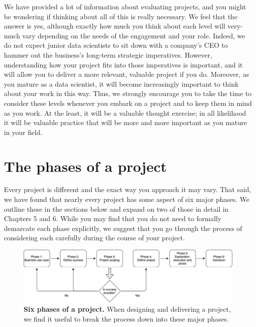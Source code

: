 \documentclass[
]{book}
\begin{document}
We have provided a lot of information about evaluating projects, and you might be wondering if thinking about all of this is really necessary. We feel that the answer is yes, although exactly how much you think about each level will very-much vary depending on the needs of the engagement and your role. Indeed, we do not expect junior data scientists to sit down with a company's CEO to hammer out the business's long-term strategic imperatives. However, understanding how your project fits into those imperatives is important, and it will allow you to deliver a more relevant, valuable project if you do. Moreover, as you mature as a data scientist, it will become increasingly important to think about your work in this way. Thus, we strongly encourage you to take the time to consider these levels whenever you embark on a project and to keep them in mind as you work. At the least, it will be a valuable thought exercise; in all likelihood it will be valuable practice that will be more and more important as you mature in your field.

\hypertarget{the-phases-of-a-project}{%
\chapter{The phases of a project}\label{the-phases-of-a-project}}

Every project is different and the exact way you approach it may vary. That said, we have found that nearly every project has some aspect of six major phases. We outline these in the sections below and expand on two of those in detail in Chapters 5 and 6. While you may find that you do not need to formally demarcate each phase explicitly, we suggest that you go through the process of considering each carefully during the course of your project.

\begin{figure}
\includegraphics[width=1\linewidth]{figures/Figure_2-phases} \caption{\textbf{Six phases of a project.} When designing and delivering a project, we find it useful to break the process down into these major phases.}\label{fig:bottom-fig}
\end{figure}
\end{document}
